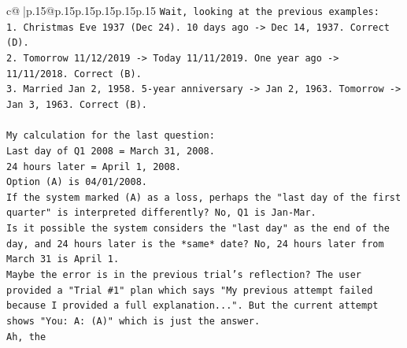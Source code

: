 \documentclass{article}
\begin{document}
{\begin{supertabular}{c@{$\;$}|p{.15\linewidth}@{}p{.15\linewidth}p{.15\linewidth}p{.15\linewidth}p{.15\linewidth}p{.15\linewidth}}
{{{\texttt{Wait, looking at the previous examples:} \\
\texttt{1. Christmas Eve 1937 (Dec 24). 10 days ago {-}> Dec 14, 1937. Correct (D).} \\
\texttt{2. Tomorrow 11/12/2019 {-}> Today 11/11/2019. One year ago {-}> 11/11/2018. Correct (B).} \\
\texttt{3. Married Jan 2, 1958. 5{-}year anniversary {-}> Jan 2, 1963. Tomorrow {-}> Jan 3, 1963. Correct (B).} \\
\\ 
\texttt{My calculation for the last question:} \\
\texttt{Last day of Q1 2008 = March 31, 2008.} \\
\texttt{24 hours later = April 1, 2008.} \\
\texttt{Option (A) is 04/01/2008.} \\
\texttt{If the system marked (A) as a loss, perhaps the "last day of the first quarter" is interpreted differently? No, Q1 is Jan{-}Mar.} \\
\texttt{Is it possible the system considers the "last day" as the end of the day, and 24 hours later is the *same* date? No, 24 hours later from March 31 is April 1.} \\
\texttt{Maybe the error is in the previous trial's reflection? The user provided a "Trial \#1" plan which says "My previous attempt failed because I provided a full explanation...". But the current attempt shows "You: A: (A)" which is just the answer.} \\
\texttt{Ah, the} \\
\\ 
}}}
\end{supertabular}}
\end{document}
